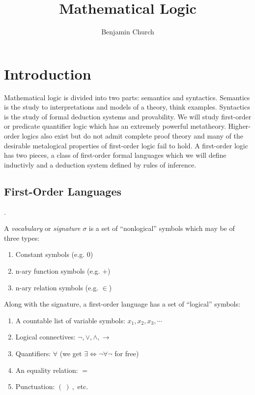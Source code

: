 \documentclass[12pt]{article}
\begin{document}
\author{Benjamin Church}
\title{\Huge Mathematical Logic}

\maketitle
\tableofcontents
\newpage


\section{Introduction}

Mathematical logic is divided into two parts: semantics and syntactics. Semantics is the study to interpretations and models of a theory, think examples. Syntactics is the study of formal deduction systems and provability. We will study first-order or predicate quantifier logic which has an extremely powerful metatheory. Higher-order logics also exist but do not admit complete proof theory and many of the desirable metalogical properties of first-order logic fail to hold. A first-order logic has two pieces, a class of first-order formal languages which we will define inductivly and a deduction system defined by rules of inference.

\subsection{First-Order Languages}.

\begin{definition}
A \textit{vocabulary} or \textit{signature} $\sigma$ is a set of ``nonlogical'' symbols which may be of three types:
\begin{enumerate}
\item Constant symbols (e.g. $0$)
\item n-ary function symbols (e.g. $+$)
\item n-ary relation symbols (e.g. $\in$)
\end{enumerate}
Along with the signature, a first-order language has a set of ``logical'' symbols:
\begin{enumerate}
\item A countable list of variable symbols: $x_1, x_2, x_3, \cdots$
\item Logical connectives: $\neg, \vee, \wedge, \to$
\item Quantifiers: $\forall$ (we get $\exists \iff \neg \forall \neg$ for free)
\item An equality relation: $=$
\item Punctuation: $( \: ) \: ,$ etc.
\end{enumerate}
\end{definition}
\end{document}
